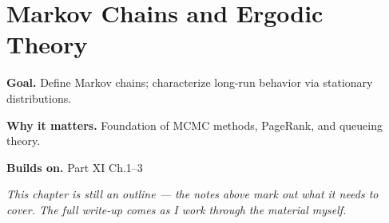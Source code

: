 \chapter{Markov Chains and Ergodic Theory}
\label{ch:11-probability-theory-06}

\begin{chapterintro}
\textbf{Goal.} Define Markov chains; characterize long-run behavior via stationary distributions.

\textbf{Why it matters.} Foundation of MCMC methods, PageRank, and queueing theory.

\textbf{Builds on.} Part XI Ch.1–3
\end{chapterintro}

\textit{This chapter is still an outline --- the notes above mark out what it needs to cover. The full write-up comes as I work through the material myself.}
